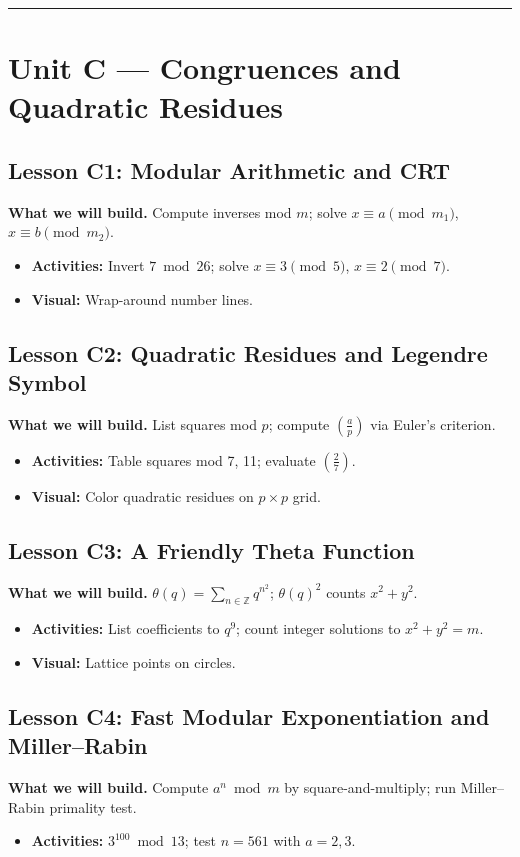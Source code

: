 \documentclass[11pt]{article}
\begin{document}
\bigskip
\hrule
\bigskip

\section*{Unit C --- Congruences and Quadratic Residues}
\subsection*{Lesson C1: Modular Arithmetic and CRT}
\textbf{What we will build.} Compute inverses mod $m$; solve $x\equiv a\pmod{m_1}$, $x\equiv b\pmod{m_2}$.
\begin{itemize}
\item \textbf{Activities:} Invert $7\bmod 26$; solve $x\equiv3\pmod5$, $x\equiv2\pmod7$.
\item \textbf{Visual:} Wrap-around number lines.
\end{itemize}

\subsection*{Lesson C2: Quadratic Residues and Legendre Symbol}
\textbf{What we will build.} List squares mod $p$; compute $\left(\frac{a}{p}\right)$ via Euler’s criterion.
\begin{itemize}
\item \textbf{Activities:} Table squares mod 7, 11; evaluate $\left(\frac{2}{7}\right)$.
\item \textbf{Visual:} Color quadratic residues on $p\times p$ grid.
\end{itemize}

\subsection*{Lesson C3: A Friendly Theta Function}
\textbf{What we will build.} $\theta(q)=\sum_{n\in\mathbb{Z}}q^{n^2}$; $\theta(q)^2$ counts $x^2+y^2$.
\begin{itemize}
\item \textbf{Activities:} List coefficients to $q^9$; count integer solutions to $x^2+y^2=m$.
\item \textbf{Visual:} Lattice points on circles.
\end{itemize}

\subsection*{Lesson C4: Fast Modular Exponentiation and Miller--Rabin}
\textbf{What we will build.} Compute $a^n\bmod m$ by square-and-multiply; run Miller--Rabin primality test.
\begin{itemize}
\item \textbf{Activities:} $3^{100}\bmod 13$; test $n=561$ with $a=2,3$.
\end{itemize}
\end{document}
